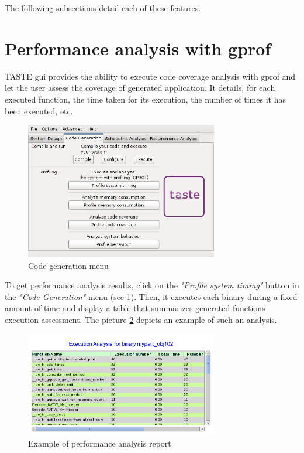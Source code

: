 \documentclass[11pt]{book}
\begin{document}
The following subsections detail each of these features.

   \section{Performance analysis with gprof}
   TASTE gui provides the ability to execute code coverage analysis with gprof
   and let the user assess the coverage of generated application. It details, for each
   executed function, the time taken for its execution, the number of times it
   has been executed, etc.


\begin{figure}[!h]
\centering
\includegraphics[width=0.75\textwidth]{imgs/tastegui-main-codegen}
\caption{Code generation menu}
\label{tastegui-code-generation-menu}
\end{figure}


   To get performance analysis results, click on the \textit{"Profile system timing"}
   button in the \textit{"Code Generation"} menu (see
   \ref{tastegui-code-generation-menu}). Then, it executes each binary during a
   fixed amount of time and display a table that summarizes generated functions
   execution assessment. The picture \ref{tastegui-gprof} depicts an example of
   such an analysis.

\begin{figure}[!h]
\centering
\includegraphics[width=0.75\textwidth]{imgs/tastegui-gcov}
\caption{Example of performance analysis report}
\label{tastegui-gprof}
\end{figure}
\end{document}
